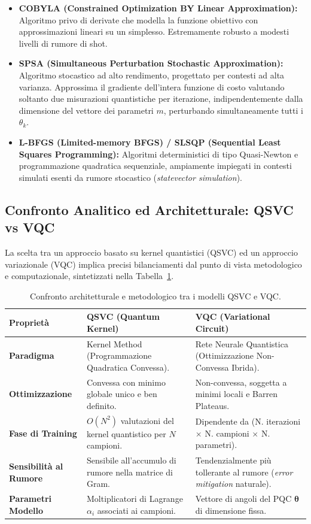 \begin{itemize}
    \item \textbf{COBYLA (Constrained Optimization BY Linear Approximation):} Algoritmo privo di derivate che modella la funzione obiettivo con approssimazioni lineari su un simplesso. Estremamente robusto a modesti livelli di rumore di shot.
    \item \textbf{SPSA (Simultaneous Perturbation Stochastic Approximation):} Algoritmo stocastico ad alto rendimento, progettato per contesti ad alta varianza. Approssima il gradiente dell'intera funzione di costo valutando soltanto due misurazioni quantistiche per iterazione, indipendentemente dalla dimensione del vettore dei parametri $m$, perturbando simultaneamente tutti i $\theta_k$.
    \item \textbf{L-BFGS (Limited-memory BFGS) / SLSQP (Sequential Least Squares Programming):} Algoritmi deterministici di tipo Quasi-Newton e programmazione quadratica sequenziale, ampiamente impiegati in contesti simulati esenti da rumore stocastico (\textit{statevector simulation}).
\end{itemize}

\subsection{Confronto Analitico ed Architetturale: QSVC vs VQC}
\label{sec:confronto_qsvc_vqc}
La scelta tra un approccio basato su kernel quantistici (QSVC) ed un approccio variazionale (VQC) implica precisi bilanciamenti dal punto di vista metodologico e computazionale, sintetizzati nella Tabella~\ref{tab:confronto_qsvc_vqc}.

\begin{table}[htbp]
\centering
\caption{Confronto architetturale e metodologico tra i modelli QSVC e VQC.}
\label{tab:confronto_qsvc_vqc}
\small
\renewcommand{\arraystretch}{1.2}
\begin{tabularx}{\textwidth}{l|X|X}
\hline
\textbf{Proprietà} & \textbf{QSVC (Quantum Kernel)} & \textbf{VQC (Variational Circuit)} \\
\hline
\textbf{Paradigma} & Kernel Method (Programmazione Quadratica Convessa). & Rete Neurale Quantistica (Ottimizzazione Non-Convessa Ibrida). \\
\textbf{Ottimizzazione} & Convessa con minimo globale unico e ben definito. & Non-convessa, soggetta a minimi locali e Barren Plateaus. \\
\textbf{Fase di Training} & $O(N^2)$ valutazioni del kernel quantistico per $N$ campioni. & Dipendente da (N. iterazioni $\times$ N. campioni $\times$ N. parametri). \\
\textbf{Sensibilità al Rumore} & Sensibile all'accumulo di rumore nella matrice di Gram. & Tendenzialmente più tollerante al rumore (\textit{error mitigation} naturale). \\
\textbf{Parametri Modello} & Moltiplicatori di Lagrange $\alpha_i$ associati ai campioni. & Vettore di angoli del PQC $\boldsymbol{\theta}$ di dimensione fissa. \\
\hline
\end{tabularx}
\end{table}

